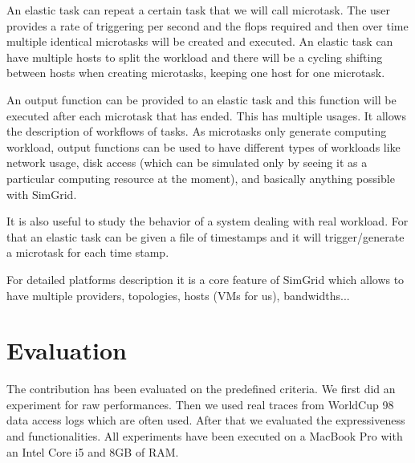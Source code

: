 \documentclass[a4paper, onecolumn]{article}
\begin{document}
  An elastic task can repeat a certain task that we will call microtask. The 
  user provides a rate of triggering per second and the flops required and then 
  over time multiple identical microtasks will be created and executed. An 
  elastic task can have multiple hosts to split the workload and there will be 
  a cycling shifting between hosts when creating microtasks, keeping one host 
  for one microtask.
  
  An output function can be provided to an elastic task and this function will 
  be executed after each microtask that has ended. This has multiple usages. It 
  allows the description of workflows of tasks. As microtasks only generate 
  computing workload, output functions can be used to have different types of 
  workloads like network usage, disk access (which can be simulated only by 
  seeing it as a particular computing resource at the moment), and basically 
  anything possible with SimGrid.
  
  It is also useful to study the behavior of a system dealing with real 
  workload. For that an elastic task can be given a file of timestamps and it 
  will trigger/generate a microtask for each time stamp.
  
  For detailed platforms description it is a core feature of SimGrid which 
  allows to have multiple providers, topologies, hosts (VMs for us), 
  bandwidths... %


\section{Evaluation} \label{eval}
  The contribution has been evaluated on the predefined criteria. We first did 
  an experiment for raw performances. Then we used real traces from WorldCup 98 
  data access logs \cite{wc98} which are often used. After that we evaluated 
  the expressiveness and functionalities. All experiments have been executed on 
  a MacBook Pro with an Intel Core i5 and 8GB of RAM.
  
    
\end{document}
